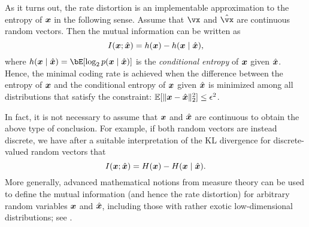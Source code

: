 \documentclass[../../book-main.tex]{subfiles}
\begin{document}
\begin{remark}
	As it turns out, the rate distortion is an implementable
	approximation to the entropy of $\bm{x}$ in the following sense.
	Assume that $\vx$ and $\hat{\vx}$ are continuous random vectors.
	Then the mutual information can be written as
	\begin{equation}\label{eq:information-entropy}
		I(\bm{x}; \hat{\bm{x}}) = h(\bm{x}) - h(\bm{x} \mid \hat {\bm{x}}),
	\end{equation}
	where $h(\x \mid \hat \x) = \bE[\log_2 p(\x \mid \hat\x)]$ is the
	\textit{conditional entropy} of $\bm{x}$ given $\hat {\bm{x}}$.
	Hence, the minimal coding rate is achieved when the difference between the
	entropy of $\bm{x}$ and the conditional entropy of $\bm{x}$ given $\hat {\bm{x}}$
	is minimized among all distributions that satisfy
	the constraint: $\mathbb{E} [\norm{\x- \hat \x}_2^2] \le \epsilon^2$. 

	In fact, it is not necessary to assume that $\bm{x}$ and $\hat {\bm{x}}$ are continuous
	to obtain the above type of conclusion. For example, if both random vectors
	are instead discrete, we have after a suitable interpretation of the KL
	divergence for discrete-valued random vectors that
	\begin{equation}
		I(\bm{x}; \hat{\bm{x}}) = H(\bm{x}) - H(\bm{x} \mid \hat {\bm{x}}).
	\end{equation}
	More generally, advanced mathematical notions from measure theory can be
	used to define the mutual information (and hence the rate distortion) for
	arbitrary random variables $\bm{x}$ and $\hat {\bm{x}}$, including those with rather
	exotic low-dimensional distributions; see \textcite[\S 8.5]{Cover-Thomas}.
\end{remark}
\end{document}

